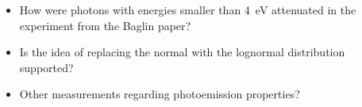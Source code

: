 
\begin{itemize}
    \item How were photons with energies smaller than 4~eV attenuated in the experiment from the Baglin paper?
    \item Is the idea of replacing the normal with the lognormal distribution supported?
    \item Other measurements regarding photoemission properties?
\end{itemize}

